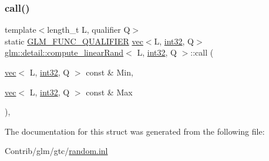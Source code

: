 \subsubsection{\texorpdfstring{call()}{call()}}
{\footnotesize\ttfamily template$<$length\+\_\+t L, qualifier Q$>$ \\
static \mbox{\hyperlink{setup_8hpp_a33fdea6f91c5f834105f7415e2a64407}{G\+L\+M\+\_\+\+F\+U\+N\+C\+\_\+\+Q\+U\+A\+L\+I\+F\+I\+ER}} \mbox{\hyperlink{structglm_1_1vec}{vec}}$<$L, \mbox{\hyperlink{namespaceglm_1_1detail_a9f85b4efeca416cdcec2fd08939a2e17}{int32}}, Q$>$ \mbox{\hyperlink{structglm_1_1detail_1_1compute__linear_rand}{glm\+::detail\+::compute\+\_\+linear\+Rand}}$<$ L, \mbox{\hyperlink{namespaceglm_1_1detail_a9f85b4efeca416cdcec2fd08939a2e17}{int32}}, Q $>$\+::call (\begin{DoxyParamCaption}\item[{\mbox{\hyperlink{structglm_1_1vec}{vec}}$<$ L, \mbox{\hyperlink{namespaceglm_1_1detail_a9f85b4efeca416cdcec2fd08939a2e17}{int32}}, Q $>$ const \&}]{Min,  }\item[{\mbox{\hyperlink{structglm_1_1vec}{vec}}$<$ L, \mbox{\hyperlink{namespaceglm_1_1detail_a9f85b4efeca416cdcec2fd08939a2e17}{int32}}, Q $>$ const \&}]{Max }\end{DoxyParamCaption})\hspace{0.3cm}{\ttfamily [inline]}, {\ttfamily [static]}}



The documentation for this struct was generated from the following file\+:\begin{DoxyCompactItemize}
\item 
Contrib/glm/gtc/\mbox{\hyperlink{random_8inl}{random.\+inl}}\end{DoxyCompactItemize}
